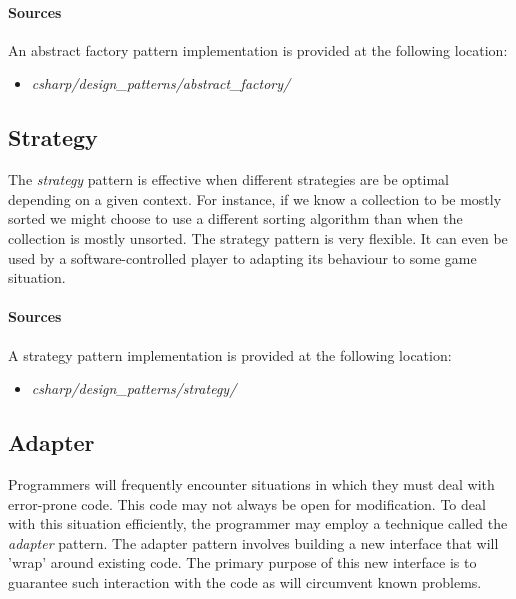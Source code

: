 \documentclass{article}
\begin{document}
{\begin{samepage}
  \paragraph{Sources}
  An abstract factory pattern implementation is provided at the following location:
  \begin{itemize}
  \item{{\em csharp/design\_patterns/abstract\_factory/}}
  \end{itemize}
\end{samepage}


\subsection{Strategy}
The {\em strategy} pattern is effective when different strategies are be optimal depending on a given context. For instance,
if we know a collection to be mostly sorted we might choose to use a different sorting algorithm than when the collection is
mostly unsorted. The strategy pattern is very flexible. It can even be used by a software-controlled player to adapting its
behaviour to some game situation.

\begin{samepage}
  \paragraph{Sources}
  A strategy pattern implementation is provided at the following location:
  \begin{itemize}
  \item{{\em csharp/design\_patterns/strategy/}}
  \end{itemize}
\end{samepage}


\subsection{Adapter}
Programmers will frequently encounter situations in which they must deal with error-prone code. This code may not always be
open for modification. To deal with this situation efficiently, the programmer may employ a technique called the
{\em adapter} pattern. The adapter pattern involves building a new interface that will 'wrap' around existing code.
The primary purpose of this new interface is to guarantee such interaction with the code as will circumvent known problems.

\begin{samepage}

\end{samepage}}
\end{document}
